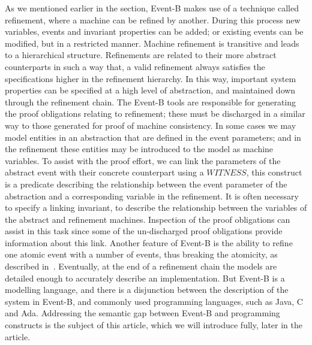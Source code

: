 As we mentioned earlier in the section, Event-B makes use of a technique called refinement, where a machine can be refined by another. During this process new variables, events and invariant properties can be added; or existing events can be modified, but in a restricted manner. Machine refinement is transitive and leads to a hierarchical structure. Refinements are related to their more abstract counterparts in such a way that, a valid refinement always satisfies the specifications higher in the refinement hierarchy. In this way, important system properties can be specified at a high level of abstraction, and maintained down through the refinement chain. The Event-B tools are responsible for generating the proof obligations relating to refinement; these must be discharged in a similar way to those generated for proof of machine consistency. In some cases we may model entities in an abstraction that are defined in the event parameters; and in the refinement these entities may be introduced to the model as machine variables. To assist with the proof effort, we can link the parameters of the abstract event with their concrete counterpart using a $WITNESS$, this construct is a predicate describing the relationship between the event parameter of the abstraction and a corresponding variable in the refinement. It is often necessary to specify a linking invariant, to describe the relationship between the variables of the abstract and refinement machines. Inspection of the proof obligations can assist in this task since some of the un-discharged proof obligations provide information about this link. Another feature of Event-B is the ability to  refine one atomic event with a number of events, thus breaking the atomicity, as described in~\cite{Butler08}. Eventually, at the end of a refinement chain the models are detailed enough to accurately describe an implementation. But Event-B is a modelling language, and there is a disjunction between the description of the system in Event-B, and commonly used programming languages, such as Java, C and Ada. Addressing the semantic gap between Event-B and programming constructs is the subject of this article, which we will introduce fully, later in the article.

